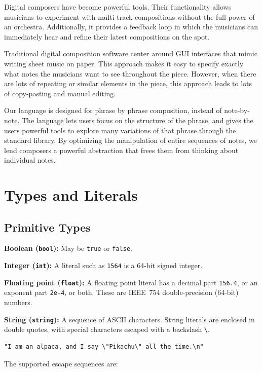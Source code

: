 \documentclass[11pt, onecolumn, letterpaper]{article}
\begin{document}
Digital composers have become powerful tools. Their functionality allows musicians to experiment with multi-track compositions without the full power of an orchestra. Additionally, it provides a feedback loop in which the musicians can immediately hear and refine their latest compositions on the spot.

Traditional digital composition software center around GUI interfaces that mimic writing sheet music on paper. This approach makes it easy to specify exactly what notes the musicians want to see throughout the piece. However, when there are lots of repeating or similar elements in the piece, this approach leads to lots of copy-pasting and manual editing.

Our language is designed for phrase by phrase composition, instead of note-by-note. The language lets users focus on the structure of the phrase, and gives the users powerful tools to explore many variations of that phrase through the standard library. By optimizing the manipulation of entire sequences of notes, we lend composers a powerful abstraction that frees them from thinking about individual notes.

\section{Types and Literals}
\subsection{Primitive Types}

\textbf{Boolean (\texttt{bool}):} May be \texttt{true} or \texttt{false}.

\textbf{Integer (\texttt{int}):} A literal such as \texttt{1564} is a 64-bit signed integer.

\textbf{Floating point (\texttt{float}):} A floating point literal has a decimal part \texttt{156.4}, or an exponent part \texttt{2e-4}, or both. These are IEEE~754 double-precision (64-bit) numbers.

\textbf{String (\texttt{string}):} A sequence of ASCII characters. String literals are enclosed in double quotes, with special characters escaped with a backslash \texttt{\textbackslash}.

\begin{lstlisting}
"I am an alpaca, and I say \"Pikachu\" all the time.\n"
\end{lstlisting}

The supported escape sequences are:
\end{document}
